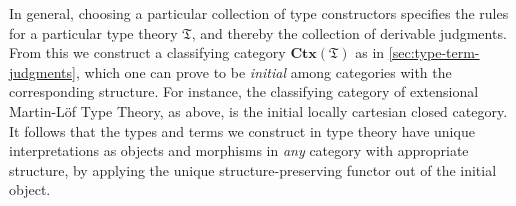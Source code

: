 \documentclass[12pt]{article}
\let\jdeq\equiv
\def\ty{\;\mathsf{type}}
\def\tsm{\textstyle\sum}
\def\proj#1{\mathsf{pr}_{#1}}
\def\types{\vdash}
\def\equiv{\mathsf{Equiv}}
\def\fT{\mathfrak{T}}
\def\CtxT{\mathbf{Ctx}(\fT)}
\numberwithin{equation}{section}
\begin{document}

In general, choosing a particular collection of type constructors specifies the rules for a particular type theory $\fT$, and thereby the collection of derivable judgments.
From this we construct a classifying category $\CtxT$ as in \cref{sec:type-term-judgments}, which
one can prove to be \emph{initial} among categories with the corresponding structure.
For instance, the classifying category of extensional Martin-L\"of Type Theory, as above, is the initial locally cartesian closed category.
It follows that the types and terms we construct in type theory have unique interpretations as objects and morphisms in \emph{any} category with appropriate structure, by applying the unique structure-preserving functor out of the initial object.
\end{document}
